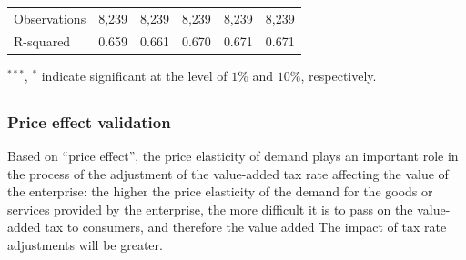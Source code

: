 \documentclass[3p,times]{elsarticle}
\begin{document}
\begin{table}[htp!]
\begin{threeparttable}
\begin{tabular}{l|ccccc}
        Observations & 8,239&	8,239&	8,239&	8,239&	8,239
         \\
        R-squared &0.659&	0.661&	0.670&	0.671	&0.671 \\
        \bottomrule
    \end{tabular}
    \begin{tablenotes}
        \item $^{***}$, $^{*}$ indicate significant at the level of $1\%$ and $10\%$, respectively.
    \end{tablenotes}
    \end{threeparttable}
    \label{tab:esti_turn}
\end{table}

\subsection{\color{red}{Path validation}}
\subsubsection{Price effect validation}
Based on “price effect”, the price elasticity of demand plays an important role in the process of the adjustment of the value-added tax rate affecting the value of the enterprise: the higher the price elasticity of the demand for the goods or services provided by the enterprise, the more difficult it is to pass on the value-added tax to consumers, and therefore the value added The impact of tax rate adjustments will be greater.
\end{document}
